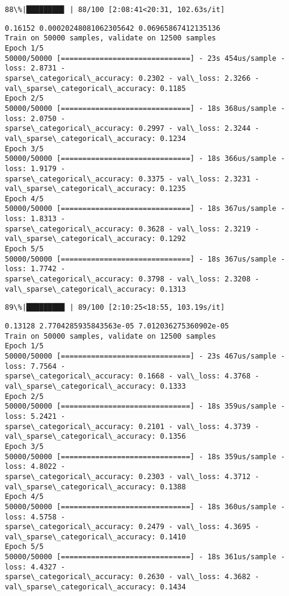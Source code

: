 \documentclass[11pt]{article}
\begin{document}
    \begin{Verbatim}[commandchars=\\\{\}]
 88\%|████████▊ | 88/100 [2:08:41<20:31, 102.63s/it]
    \end{Verbatim}

    \begin{Verbatim}[commandchars=\\\{\}]
0.16152 0.00020248081062305642 0.06965867412135136
Train on 50000 samples, validate on 12500 samples
Epoch 1/5
50000/50000 [==============================] - 23s 454us/sample - loss: 2.8731 -
sparse\_categorical\_accuracy: 0.2302 - val\_loss: 2.3266 -
val\_sparse\_categorical\_accuracy: 0.1185
Epoch 2/5
50000/50000 [==============================] - 18s 368us/sample - loss: 2.0750 -
sparse\_categorical\_accuracy: 0.2997 - val\_loss: 2.3244 -
val\_sparse\_categorical\_accuracy: 0.1234
Epoch 3/5
50000/50000 [==============================] - 18s 366us/sample - loss: 1.9179 -
sparse\_categorical\_accuracy: 0.3375 - val\_loss: 2.3231 -
val\_sparse\_categorical\_accuracy: 0.1235
Epoch 4/5
50000/50000 [==============================] - 18s 367us/sample - loss: 1.8313 -
sparse\_categorical\_accuracy: 0.3628 - val\_loss: 2.3219 -
val\_sparse\_categorical\_accuracy: 0.1292
Epoch 5/5
50000/50000 [==============================] - 18s 367us/sample - loss: 1.7742 -
sparse\_categorical\_accuracy: 0.3798 - val\_loss: 2.3208 -
val\_sparse\_categorical\_accuracy: 0.1313
    \end{Verbatim}

    \begin{Verbatim}[commandchars=\\\{\}]
 89\%|████████▉ | 89/100 [2:10:25<18:55, 103.19s/it]
    \end{Verbatim}

    \begin{Verbatim}[commandchars=\\\{\}]
0.13128 2.7704285935843563e-05 7.012036275360902e-05
Train on 50000 samples, validate on 12500 samples
Epoch 1/5
50000/50000 [==============================] - 23s 467us/sample - loss: 7.7564 -
sparse\_categorical\_accuracy: 0.1668 - val\_loss: 4.3768 -
val\_sparse\_categorical\_accuracy: 0.1333
Epoch 2/5
50000/50000 [==============================] - 18s 359us/sample - loss: 5.2421 -
sparse\_categorical\_accuracy: 0.2101 - val\_loss: 4.3739 -
val\_sparse\_categorical\_accuracy: 0.1356
Epoch 3/5
50000/50000 [==============================] - 18s 359us/sample - loss: 4.8022 -
sparse\_categorical\_accuracy: 0.2303 - val\_loss: 4.3712 -
val\_sparse\_categorical\_accuracy: 0.1388
Epoch 4/5
50000/50000 [==============================] - 18s 360us/sample - loss: 4.5758 -
sparse\_categorical\_accuracy: 0.2479 - val\_loss: 4.3695 -
val\_sparse\_categorical\_accuracy: 0.1410
Epoch 5/5
50000/50000 [==============================] - 18s 361us/sample - loss: 4.4327 -
sparse\_categorical\_accuracy: 0.2630 - val\_loss: 4.3682 -
val\_sparse\_categorical\_accuracy: 0.1434
    \end{Verbatim}
\end{document}
